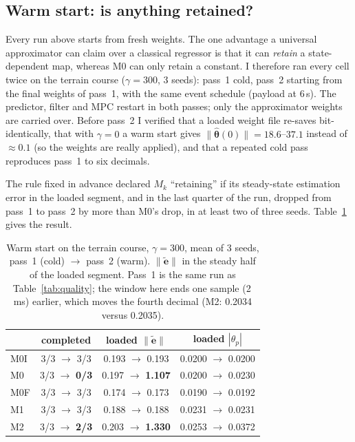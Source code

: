 \documentclass[conference]{IEEEtran}
\newcommand{\thetahat}{\hat{\bm\theta}}
\newcommand{\etilde}{\tilde{\bm e}}
\begin{document}
\subsection{Warm start: is anything retained?}\label{sec:warm}
Every run above starts from fresh weights. The one advantage a universal
approximator can claim over a classical regressor is that it can
\emph{retain} a state-dependent map, whereas M0 can only retain a
constant. I therefore ran every cell twice on the terrain course
($\gamma=300$, 3 seeds): pass~1 cold, pass~2 starting from the final
weights of pass~1, with the same event schedule (payload at 6\,s). The
predictor, filter and MPC restart in both passes; only the approximator
weights are carried over. Before pass~2 I verified that a loaded weight
file re-saves bit-identically, that with $\gamma=0$ a warm start gives
$\|\thetahat(0)\|=18.6$--$37.1$ instead of ${\approx}0.1$ (so the weights
are really applied), and that a repeated cold pass reproduces pass~1 to
six decimals.

The rule fixed in advance declared $M_k$ ``retaining'' if its
steady-state estimation error in the loaded segment, and in the last
quarter of the run, dropped from pass~1 to pass~2 by more than M0's drop,
in at least two of three seeds. Table~\ref{tab:warm} gives the result.

\begin{table}[t]
\centering
\caption{Warm start on the terrain course, $\gamma=300$, mean of 3 seeds,
pass~1 (cold) $\to$ pass~2 (warm). $\|\etilde\|$ in the steady half of
the loaded segment. Pass~1 is the same run as Table~\ref{tab:quality};
the window here ends one sample (2\,ms) earlier, which moves the fourth
decimal (M2: 0.2034 versus 0.2035).}
\label{tab:warm}
\renewcommand{\arraystretch}{1.12}
\setlength{\tabcolsep}{4pt}
\begin{tabular}{lccc}
\hline
 & completed & loaded $\|\etilde\|$ & loaded $|\theta_p|$\\
\hline
M0I & 3/3 $\to$ 3/3 & 0.193 $\to$ 0.193 & 0.0200 $\to$ 0.0200\\
M0 & 3/3 $\to$ \textbf{0/3} & 0.197 $\to$ \textbf{1.107} & 0.0200 $\to$ 0.0230\\
M0F & 3/3 $\to$ 3/3 & 0.174 $\to$ 0.173 & 0.0190 $\to$ 0.0192\\
M1 & 3/3 $\to$ 3/3 & 0.188 $\to$ 0.188 & 0.0231 $\to$ 0.0231\\
M2 & 3/3 $\to$ \textbf{2/3} & 0.203 $\to$ \textbf{1.330} & 0.0253 $\to$ 0.0372\\
\hline
\end{tabular}
\end{table}
\end{document}
